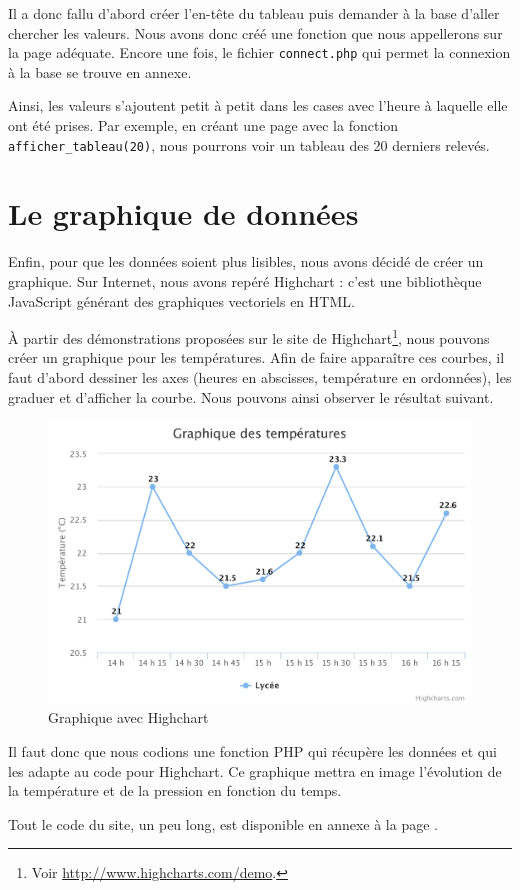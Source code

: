 Il a donc fallu d'abord créer l'en-tête du tableau puis demander à la base d'aller chercher les valeurs. Nous avons donc créé une fonction que nous appellerons sur la page adéquate. Encore une fois, le fichier \verb-connect.php- qui permet la connexion à la base se trouve en annexe.

Ainsi, les valeurs s'ajoutent petit à petit dans les cases avec l'heure à laquelle elle ont été prises. Par exemple, en créant une page avec la fonction \verb-afficher_tableau(20)-, nous pourrons voir un tableau des 20 derniers relevés.

\section{Le graphique de données}

Enfin, pour que les données soient plus lisibles, nous avons décidé de créer un graphique. Sur Internet, nous avons repéré Highchart : c'est une bibliothèque JavaScript générant des graphiques vectoriels en HTML.

À partir des démonstrations proposées sur le site de Highchart\footnote{Voir \url{http://www.highcharts.com/demo}.}, nous pouvons créer un graphique pour les températures. Afin de faire apparaître ces courbes, il faut d'abord dessiner les axes (heures en abscisses, température en ordonnées), les graduer et d'afficher la courbe.
Nous pouvons ainsi observer le résultat suivant.

\begin{figure}[!h]
	\centering
	\includegraphics[width=.7\linewidth]{Images/Exemple_graphique}
	\caption{Graphique avec Highchart}
\end{figure}

Il faut donc que nous codions une fonction PHP qui récupère les données et qui les adapte au code pour Highchart. Ce graphique mettra en image l'évolution de la température et de la pression en fonction du temps.

Tout le code du site, un peu long, est disponible en annexe à la page \pageref{code:site}.
